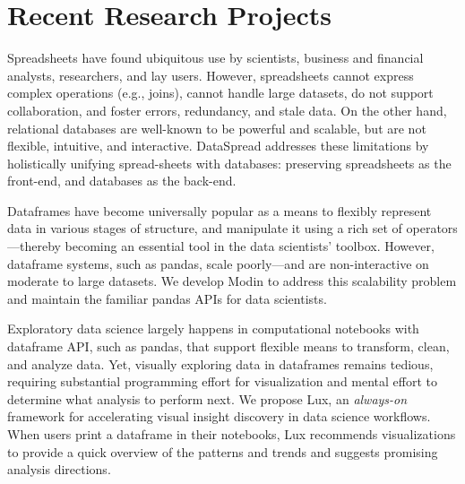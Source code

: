 \documentclass[10pt]{article} %
\begin{document}

\section{Recent Research Projects}

{Spreadsheets have found ubiquitous use by scientists, business and financial analysts, 
researchers, and lay users. However, spreadsheets cannot express complex operations (e.g., joins), 
cannot handle large datasets, do not support collaboration, and foster errors, redundancy, and stale data. 
On the other hand, relational databases are well-known to be powerful and scalable, but are not flexible, intuitive, and interactive.
DataSpread addresses these limitations by holistically unifying spread-sheets with databases: 
preserving spreadsheets as the front-end, and databases as the back-end.}

{Dataframes have become universally popular as a means to flexibly represent data 
in various stages of structure, and manipulate it using a rich set of operators---thereby becoming an essential tool in the data scientists' toolbox. However, dataframe systems, such as pandas, scale poorly---and are non-interactive on moderate
to large datasets. We develop Modin to address this scalability problem and maintain the familiar pandas APIs for data scientists.}

{Exploratory data science largely happens in computational notebooks with dataframe API, such as pandas, 
that support flexible means to transform, clean, and analyze data.
Yet, visually exploring data in dataframes remains tedious, requiring substantial programming effort for visualization 
and mental effort to determine what analysis to perform next. 
We propose Lux, an \emph{always-on} framework for accelerating visual insight discovery in data science workflows. 
When users print a dataframe in their notebooks, 
Lux recommends visualizations to provide a quick overview of the patterns and trends and suggests promising analysis directions.}
\end{document}
